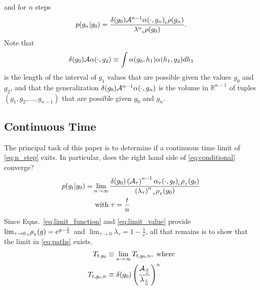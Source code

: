 \documentclass[12pt]{article} \usepackage{amsmath,amsfonts}
\newcommand{\Aop}{{\cal A}}
\newcommand{\Aindicate}{\alpha}
\newcommand{\density}{p}
\newcommand{\rightfunction}{{_{_{\scalebox{.4}{R}}} \rho}}
\newcommand{\field}[1]{\mathbb{#1}}
\newcommand\REAL{\field{R}}
\begin{document}
and for $n$ steps
\begin{equation}
  \label{eq:n_step}
  \density(g_n | g_0) = \frac{\delta(g_0) \Aop^{n-1} \Aindicate(\cdot,g_n)
    \rightfunction(g_n)}{\lambda^n \rightfunction(g_0)}.  
\end{equation}
Note that
\begin{equation*}
  \delta(g_0) \Aop \Aindicate(\cdot,g_2) \equiv \int
  \Aindicate(g_0,h_1) \Aindicate(h_1,g_2) dh_1
\end{equation*}
is the length of the interval of $g_1$ values that are possible given
the values $g_0$ and $g_2$, and that the generalization
$\delta(g_0) \Aop^{n-1} \Aindicate(\cdot,g_n)$ is the volume in
$\REAL^{n-1}$ of tuples $(g_1,g_2,\ldots,g_{n-1})$ that are possible
given $g_0$ and $g_n$.

\subsection{Continuous Time}
\label{sec:continuous_t}

The principal task of this paper is to determine if a continuous time
limit of \eqref{eq:n_step} exits.  In particular, does the right hand
side of \eqref{eq:conditional} converge?
\begin{align}
  \label{eq:conditional}
  \density(g_t|g_0) = &\lim_{n \rightarrow \infty}  \frac{\delta(g_0)
    \left( \Aop_\tau \right)^{n-1} \Aindicate_\tau(\cdot,g_t)
    \rightfunction_\tau(g_t)} { \left( \lambda_\tau \right)^n
    \rightfunction_\tau(g_0)} \\
  & \text{ with } \tau=\frac{t}{n} \nonumber
\end{align}
Since Eqns.~\eqref{eq:limit_function} and \eqref{eq:limit_value}
provide
$\lim_{\tau \rightarrow 0} \rightfunction_\tau(g) = e^{g-\frac{1}{2}}$
and $\lim_{\tau \rightarrow 0} \lambda_\tau = 1 - \frac{1}{e}$, all
that remains is to show that the limit in \eqref{eq:paths} exists.
\begin{align}
  \label{eq:paths}
  T_{t,g_0} & \equiv \lim_{n \rightarrow \infty} T_{t,g_0,n}, \text{
  where}\\
  T_{t,g_0,n} & \equiv \delta(g_0) \left( \frac{\Aop_{\frac{t}{n}}}
                {\lambda_{\frac{t}{n}}} \right)^n  \nonumber
\end{align}
\end{document}
